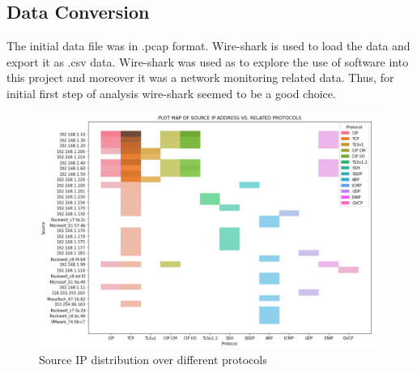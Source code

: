 \documentclass{article}
\begin{document}
\subsection{Data Conversion}
The initial data file was in .pcap format. Wire-shark is used to load the data and export it as .csv data. Wire-shark was used as to explore the use of software into this project and moreover it was a network monitoring related data. Thus, for initial first step of analysis wire-shark seemed to be a good choice.
\begin{figure}[h!]
\centering
\includegraphics[scale=0.60]{source_protocol.PNG}
\caption{Source IP distribution over different protocols}
\label{fig:universe}
\end{figure}
\end{document}
